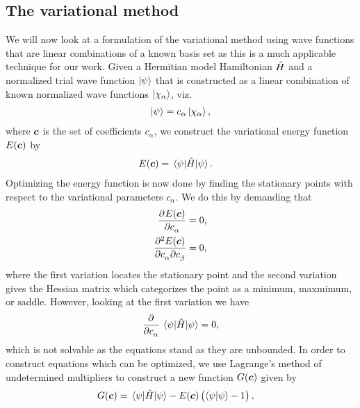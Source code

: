         \subsection{The variational method}
            \label{subsec:variational-method}
            We will now look at a formulation of the variational method using
            wave functions that are linear combinations of a known basis set as
            this is a much applicable technique for our work.
            Given a Hermitian model Hamiltonian $\hat{H}$ and a normalized trial
            wave function $\ket{\psi}$ that is constructed as a linear
            combination of known normalized wave functions
            $\ket{\chi_{\alpha}}$, viz.
            \begin{align}
                \ket{\psi} = c_{\alpha}\ket{\chi_{\alpha}},
            \end{align}
            where $\boldsymbol{c}$ is the set of coefficients $c_{\alpha}$, we
            construct the variational energy function $E(\boldsymbol{c})$ by
            \begin{align}
                E(\boldsymbol{c})
                &= \mel{\psi}{\hat{H}}{\psi}.
            \end{align}
            Optimizing the energy function is now done by finding the
            stationary points with respect to the variational parameters
            $c_{\alpha}$.
            We do this by demanding that
            \begin{align}
                \dpd[]{E(\vfg{c})}{c_{\alpha}} &= 0,
                \\
                \dmd{E(\vfg{c})}{2}{c_{\alpha}}{}{c_{\beta}}{} &= 0,
            \end{align}
            where the first variation locates the stationary point and the
            second variation gives the Hessian matrix which categorizes the
            point as a minimum, maxmimum, or saddle.
            However, looking at the first variation we have
            \begin{align}
                \dpd{}{c_{\alpha}}\mel{\psi}{\hamil}{\psi} = 0,
            \end{align}
            which is not solvable as the equations stand \cite{szabo1996modern}
            as they are unbounded.
            In order to construct equations which can be optimized, we use
            Lagrange's method of undetermined multipliers to construct a new
            function $G(\boldsymbol{c})$ given by \cite{helgaker-molecular,
            szabo1996modern}
            \begin{align}
                G(\boldsymbol{c})
                &=
                \mel{\psi}{\hat{H}}{\psi}
                - E(\boldsymbol{c}) \left( \braket{\psi}{\psi} - 1 \right),
            \end{align}
